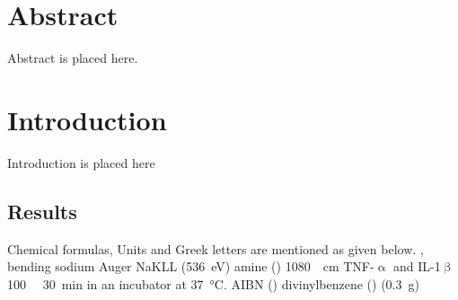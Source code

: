 \newpage
\null
\thispagestyle{empty}
\newpage
\begin{refsection}%

\vspace*{\fill}
\begin{center}
\end{center}
\vspace*{\fill}


\section{Abstract}

Abstract is placed here.
\section{Introduction}

Introduction is placed here %
	
\subsection{Results}
Chemical formulas, Units and Greek letters are mentioned as given below.
, bending
sodium Auger NaKLL (\SI{536}{\electronvolt})
amine ()
\SI{1080}{\per\centi\metre}
TNF-$\upalpha$ and IL-1$\upbeta$
\SI{100}{\milli\molar}
\SI{30}{\minute} in an incubator at \SI{37}{\degreeCelsius}.
AIBN ()
divinylbenzene () (\SI{0.3}{\gram})
\clearpage
\printbibliography
\clearpage
\end{refsection}